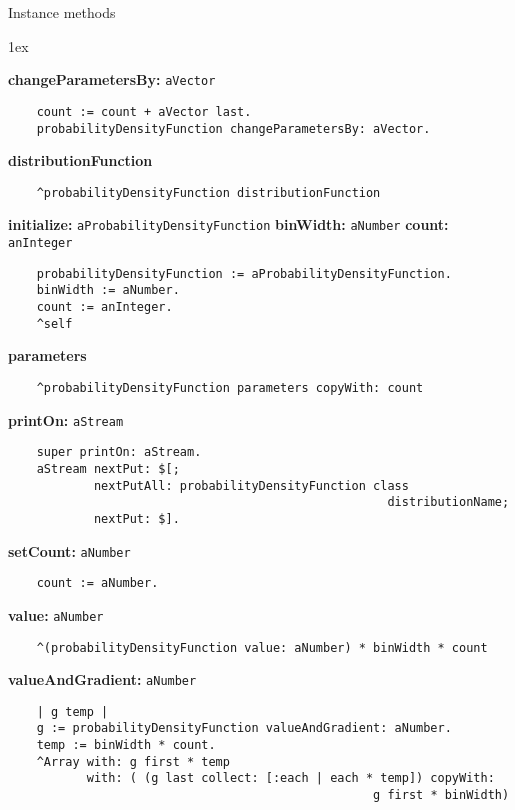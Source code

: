 Instance methods
{\parskip 1ex\par\noindent}
{\bf changeParametersBy:} {\tt aVector}
\begin{verbatim}
    count := count + aVector last.
    probabilityDensityFunction changeParametersBy: aVector.

\end{verbatim}
{\bf distributionFunction}
\begin{verbatim}
    ^probabilityDensityFunction distributionFunction

\end{verbatim}
{\bf initialize:} {\tt aProbabilityDensityFunction} {\bf binWidth:} {\tt aNumber} {\bf count:} {\tt anInteger}
\begin{verbatim}
    probabilityDensityFunction := aProbabilityDensityFunction.
    binWidth := aNumber.
    count := anInteger.
    ^self

\end{verbatim}
{\bf parameters}
\begin{verbatim}
    ^probabilityDensityFunction parameters copyWith: count

\end{verbatim}
{\bf printOn:} {\tt aStream}
\begin{verbatim}
    super printOn: aStream.
    aStream nextPut: $[;
            nextPutAll: probabilityDensityFunction class 
                                                     distributionName;
            nextPut: $].

\end{verbatim}
{\bf setCount:} {\tt aNumber}
\begin{verbatim}
    count := aNumber.

\end{verbatim}
{\bf value:} {\tt aNumber}
\begin{verbatim}
    ^(probabilityDensityFunction value: aNumber) * binWidth * count

\end{verbatim}
{\bf valueAndGradient:} {\tt aNumber}
\begin{verbatim}
    | g temp |
    g := probabilityDensityFunction valueAndGradient: aNumber.
    temp := binWidth * count.
    ^Array with: g first * temp
           with: ( (g last collect: [:each | each * temp]) copyWith: 
                                                   g first * binWidth)

\end{verbatim}

